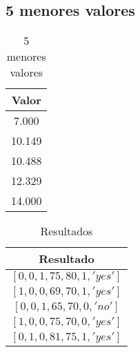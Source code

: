 \subsection {5 menores valores} \label{subsec:5 menores valores}

\begin{table}[htbp]
    \centering
    \caption{5 menores valores}
    \label{tab:cinco_menores_valores}
    \begin{tabular}{|c|}
    \hline
    \textbf{Valor} \\
    \hline
    7.000 \\
    10.149 \\
    10.488 \\
    12.329 \\
    14.000 \\
    \hline
    \end{tabular}
\end{table}

\begin{table}[htbp]
    \centering
    \caption{Resultados}
    \label{tab:k5_resultados}
    \begin{tabular}{|c|}
    \hline
    \textbf{Resultado} \\
    \hline
    $[0, 0, 1, 75, 80, 1, 'yes']$ \\
    $[1, 0, 0, 69, 70, 1, 'yes']$ \\
    $[0, 0, 1, 65, 70, 0, 'no']$ \\
    $[1, 0, 0, 75, 70, 0, 'yes']$ \\
    $[0, 1, 0, 81, 75, 1, 'yes']$ \\
    \hline
    \end{tabular}
\end{table}
